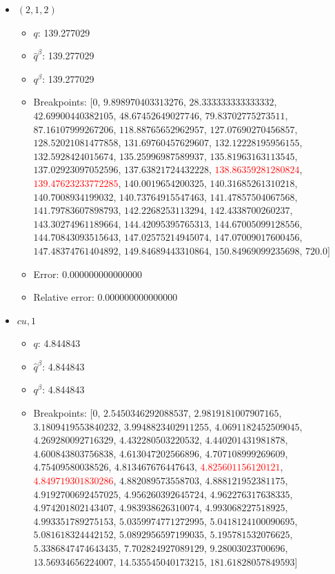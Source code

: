 \documentclass{article}%
\begin{document}
\begin{itemize}
\begin{itemize}
		\item Error: 0.000000000000000%
		\item Relative error: 0.000000000000000%
	\end{itemize}%
	\item $(2, 1, 2)$%
	\begin{itemize}%
		\item $q$: 139.277029%
		\item $\hat{q}^\beta$: 139.277029%
		\item $q^\beta$: 139.277029%
		\item Breakpoints: $[$$0$, $9.898970403313276$, $28.333333333333332$, $42.69900440382105$, $48.67452649027746$, $79.83702775273511$, $87.16107999267206$, $118.88765652962957$, $127.07690270456857$, $128.52021081477858$, $131.69760457629607$, $132.12228195956155$, $132.5928424015674$, $135.25996987589937$, $135.81963163113545$, $137.02923097052596$, $137.63821724432228$, \textcolor{red}{$138.86359281280824$}, \textcolor{red}{$139.47623233772285$}, $140.0019654200325$, $140.31685261310218$, $140.7008934199032$, $140.73764915547463$, $141.47857504067568$, $141.79783607898793$, $142.2268253113294$, $142.4338700260237$, $143.30274961189664$, $144.42095395765313$, $144.67005099128556$, $144.70843093515643$, $147.02575214945074$, $147.07009017600456$, $147.48374761404892$, $149.84689443310864$, $150.84969099235698$, $720.0$$]$%
		\item Error: 0.000000000000000%
		\item Relative error: 0.000000000000000%
	\end{itemize}%
	\item $\textit{cu},1$%
	\begin{itemize}%
		\item $q$: 4.844843%
		\item $\hat{q}^\beta$: 4.844843%
		\item $q^\beta$: 4.844843%
		\item Breakpoints: $[$$0$, $2.5450346292088537$, $2.9819181007907165$, $3.1809419553840232$, $3.9948823402911255$, $4.0691182452509045$, $4.269280092716329$, $4.432280503220532$, $4.440201431981878$, $4.600843803756838$, $4.613047202566896$, $4.707108999269609$, $4.75409580038526$, $4.813467676447643$, \textcolor{red}{$4.825601156120121$}, \textcolor{red}{$4.849719301830286$}, $4.882089573558703$, $4.888121952381175$, $4.9192700692457025$, $4.956260392645724$, $4.962276317638335$, $4.974201802143407$, $4.983938626310074$, $4.993068227518925$, $4.993351789275153$, $5.0359974771272995$, $5.0418124100090695$, $5.081618324442152$, $5.0892956597199035$, $5.195781532076625$, $5.3386847474643435$, $7.702824927089129$, $9.28003023700696$, $13.56934656224007$, $14.535545040173215$, $181.61828057849593$$]$%

\end{itemize}
\end{itemize}
\end{document}
